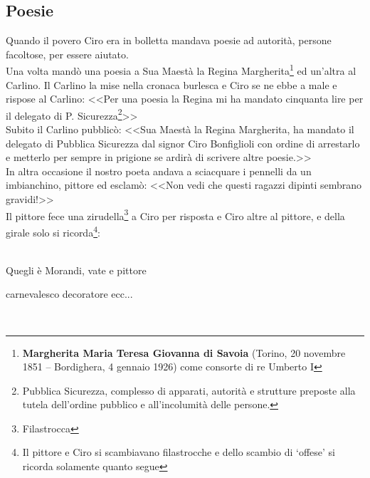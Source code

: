 \subsection{Poesie}
Quando il povero Ciro era in bolletta mandava poesie ad autorità, persone facoltose, per essere aiutato.\\
\indent Una volta mandò una poesia a Sua Maestà la Regina Margherita\footnote{\textbf{Margherita Maria Teresa Giovanna di Savoia} (Torino, 20 novembre 1851 – Bordighera, 4 gennaio 1926) come consorte di re Umberto I} ed un'altra al Carlino. Il Carlino la mise nella cronaca burlesca e Ciro se ne ebbe a male e rispose al Carlino: <<Per una poesia la Regina mi ha mandato cinquanta lire per il delegato di P. Sicurezza\footnote{Pubblica Sicurezza, complesso di apparati, autorità e strutture preposte alla tutela dell'ordine pubblico e all'incolumità delle persone.}>>\\
\indent Subito il Carlino pubblicò: <<Sua Maestà la Regina Margherita, ha mandato il delegato di Pubblica Sicurezza dal signor Ciro Bonfiglioli con ordine di arrestarlo e metterlo per sempre in prigione se ardirà di scrivere altre poesie.>>\\
\indent In altra occasione il nostro poeta andava a sciacquare i pennelli da un imbianchino, pittore ed esclamò: <<Non vedi che questi ragazzi dipinti sembrano gravidi!>>\\
\indent Il pittore fece una zirudella\footnote{Filastrocca} a Ciro per risposta e Ciro altre al pittore, e della girale solo si ricorda\footnote{Il pittore e Ciro si scambiavano filastrocche e dello scambio di `offese' si ricorda solamente quanto segue}:\\\\
\textcal \Huge
	\centerline{Quegli è Morandi, vate e pittore}
	\centerline{carnevalesco decoratore ecc...} 
\normalfont \normalsize
\\

